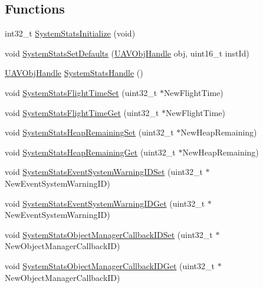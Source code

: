 \subsection*{\-Functions}
\begin{DoxyCompactItemize}
\item 
int32\-\_\-t \hyperlink{group___system_stats_ga24bafc0da4b73047bb2d9c1e0005c229}{\-System\-Stats\-Initialize} (void)
\item 
void \hyperlink{group___system_stats_ga5fc1460b1797c7effc1de9d28b1f2d72}{\-System\-Stats\-Set\-Defaults} (\hyperlink{targets_2_u_a_v_objects_2inc_2uavobjectmanager_8h_a279053e22be53ce9f895043aaeb91e3b}{\-U\-A\-V\-Obj\-Handle} obj, uint16\-\_\-t inst\-Id)
\item 
\hyperlink{targets_2_u_a_v_objects_2inc_2uavobjectmanager_8h_a279053e22be53ce9f895043aaeb91e3b}{\-U\-A\-V\-Obj\-Handle} \hyperlink{group___system_stats_ga0ffd13fd4a24f30171ff63df93fb7b6b}{\-System\-Stats\-Handle} ()
\item 
void \hyperlink{group___system_stats_ga48bd6163689b99d7e6c58b4ad12a420a}{\-System\-Stats\-Flight\-Time\-Set} (uint32\-\_\-t $\ast$\-New\-Flight\-Time)
\item 
void \hyperlink{group___system_stats_gaf41f4d35e7815842a069175e62bb88dc}{\-System\-Stats\-Flight\-Time\-Get} (uint32\-\_\-t $\ast$\-New\-Flight\-Time)
\item 
void \hyperlink{group___system_stats_ga350ce2273c9fe5028d10035b36afabf2}{\-System\-Stats\-Heap\-Remaining\-Set} (uint32\-\_\-t $\ast$\-New\-Heap\-Remaining)
\item 
void \hyperlink{group___system_stats_ga0e60130a6b66c3a20bb449ee97b0e2c2}{\-System\-Stats\-Heap\-Remaining\-Get} (uint32\-\_\-t $\ast$\-New\-Heap\-Remaining)
\item 
void \hyperlink{group___system_stats_ga6f49671a111b4daba067905b10a6bc26}{\-System\-Stats\-Event\-System\-Warning\-I\-D\-Set} (uint32\-\_\-t $\ast$\-New\-Event\-System\-Warning\-I\-D)
\item 
void \hyperlink{group___system_stats_gaf9219bd5b8f18348901ba142c5901ee7}{\-System\-Stats\-Event\-System\-Warning\-I\-D\-Get} (uint32\-\_\-t $\ast$\-New\-Event\-System\-Warning\-I\-D)
\item 
void \hyperlink{group___system_stats_ga178281ed1db851c2ace5b69e110a4b20}{\-System\-Stats\-Object\-Manager\-Callback\-I\-D\-Set} (uint32\-\_\-t $\ast$\-New\-Object\-Manager\-Callback\-I\-D)
\item 
void \hyperlink{group___system_stats_gac7c62c216e8fd3683466973d5c0111f8}{\-System\-Stats\-Object\-Manager\-Callback\-I\-D\-Get} (uint32\-\_\-t $\ast$\-New\-Object\-Manager\-Callback\-I\-D)

\end{DoxyCompactItemize}
